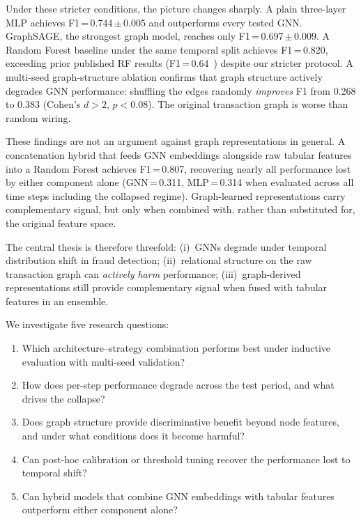 Under these stricter conditions, the picture changes sharply.  A plain
three-layer MLP achieves F1\,=\,0.744\,$\pm$\,0.005 and outperforms
every tested GNN.  GraphSAGE, the strongest graph model, reaches only
F1\,=\,0.697\,$\pm$\,0.009.  A Random Forest baseline under the same
temporal split achieves F1\,=\,0.820, exceeding prior published RF
results (F1\,=\,0.64~\citep{weber2019}) despite our stricter protocol.
A multi-seed graph-structure ablation confirms that graph structure
actively degrades GNN performance: shuffling the edges randomly
\emph{improves} F1 from 0.268 to 0.383 (Cohen's $d > 2$, $p < 0.08$).
The original transaction graph is worse than random wiring.

These findings are not an argument against graph representations in
general.  A concatenation hybrid that feeds GNN embeddings alongside
raw tabular features into a Random Forest achieves F1\,=\,0.807,
recovering nearly all performance lost by either component alone
(GNN\,=\,0.311, MLP\,=\,0.314 when evaluated across all time steps
including the collapsed regime).  Graph-learned representations
carry complementary signal, but only when combined with, rather than
substituted for, the original feature space.

The central thesis is therefore threefold: (i)~GNNs degrade under
temporal distribution shift in fraud detection; (ii)~relational
structure on the raw transaction graph can \emph{actively harm}
performance; (iii)~graph-derived representations still provide
complementary signal when fused with tabular features in an ensemble.

We investigate five research questions:

\begin{enumerate}[leftmargin=*,label=\textbf{RQ\arabic*}]
  \item Which architecture--strategy combination performs best under
    inductive evaluation with multi-seed validation?
  \item How does per-step performance degrade across the test period,
    and what drives the collapse?
  \item Does graph structure provide discriminative benefit beyond
    node features, and under what conditions does it become harmful?
  \item Can post-hoc calibration or threshold tuning recover the
    performance lost to temporal shift?
  \item Can hybrid models that combine GNN embeddings with tabular
    features outperform either component alone?
\end{enumerate}

